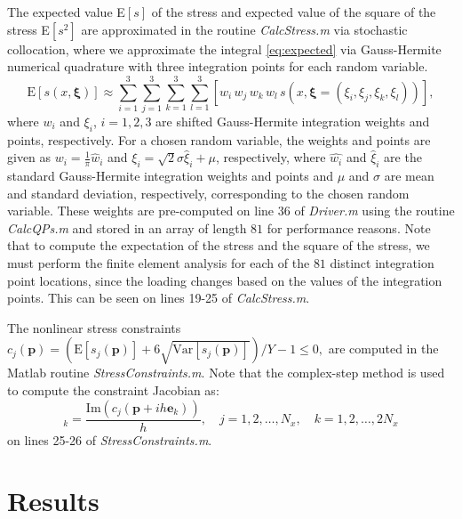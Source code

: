 \documentclass[10pt]{article}
\newcommand{\bs}[1] {\boldsymbol{#1}}
\begin{document}
The expected value E$[s]$ of the stress
and expected value of the square of the stress E$[s^2]$
are approximated in the routine \emph{CalcStress.m} via
stochastic collocation, where we approximate the integral
\eqref{eq:expected} via Gauss-Hermite numerical quadrature
with three integration points for each random variable.
%
\begin{equation}
\text{E}[s(x, \bs{\xi})] \approx
\sum_{i=1}^3 \sum_{j=1}^3 \sum_{k=1}^3 \sum_{l=1}^3
\left[
w_i \, w_j \, w_k \, w_l  \,
s(x, \bs{\xi} = (\xi_i, \xi_j, \xi_k, \xi_l))
\right],
\end{equation}
%
where $w_i$ and $\xi_i$, $i=1,2,3$ are shifted
Gauss-Hermite integration weights and points, respectively.
For a chosen random variable, the weights and points are given as
$w_i = \frac{1}{\pi} \hat{w}_i$ and
$\xi_i = \sqrt{2} \sigma \hat{\xi}_i + \mu$, respectively,
where $\hat{w_i}$ and $\hat{\xi}_i$ are the standard
Gauss-Hermite integration weights and points and
$\mu$ and $\sigma$ are mean and standard deviation, respectively,
corresponding to the chosen random variable.
These weights are pre-computed on line 36 of \emph{Driver.m}
using the routine \emph{CalcQPs.m} and stored in an array of
length $81$ for performance reasons.
Note that to compute the expectation of the stress and the
square of the stress, we must perform the finite element
analysis for each of the $81$ distinct integration point locations,
since
the loading changes based on the values of the integration
points. This can be seen on lines 19-25 of \emph{CalcStress.m}.

The nonlinear stress constraints
$c_j(\bs{p}) = \left(\text{E}[s_j(\bs{p})] +
6 \sqrt{\text{Var}[s_j(\bs{p})] } \right) / Y 
- 1 \leq 0,$
are computed in the Matlab routine \emph{StressConstraints.m}.
Note that the complex-step method is used to compute the constraint
Jacobian as: 
%
\begin{equation}
[ \nabla c_j(\bs{p}) ]_k = \frac{\text{Im}(c_j( \bs{p} + i h \bs{e}_k))}{h},
\quad j=1,2,\dots,N_x,
\quad k=1,2,\dots,2N_x
\end{equation}
%
on lines 25-26 of \emph{StressConstraints.m}.

\section{Results}
\end{document}
